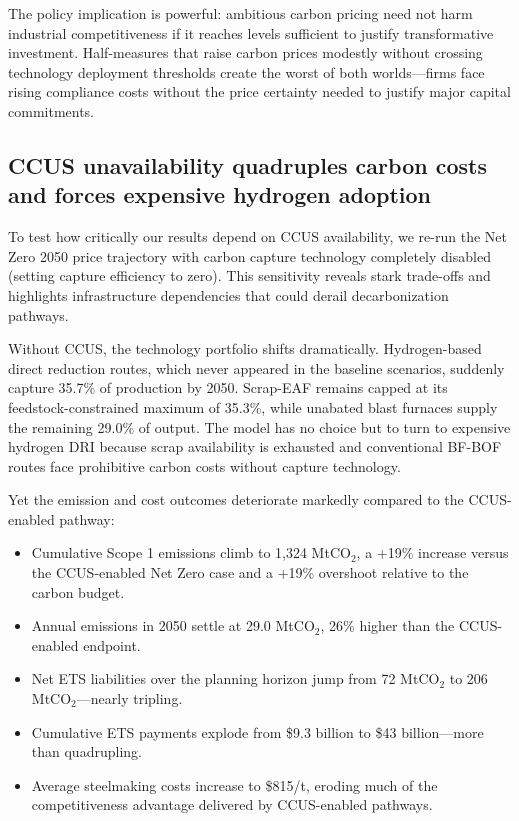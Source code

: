 \documentclass[preprint,1p,authoryear]{elsarticle}
\begin{document}
The policy implication is powerful: ambitious carbon pricing need not harm industrial competitiveness if it reaches levels sufficient to justify transformative investment. Half-measures that raise carbon prices modestly without crossing technology deployment thresholds create the worst of both worlds—firms face rising compliance costs without the price certainty needed to justify major capital commitments.

\subsection{CCUS unavailability quadruples carbon costs and forces expensive hydrogen adoption}

To test how critically our results depend on CCUS availability, we re-run the Net Zero 2050 price trajectory with carbon capture technology completely disabled (setting capture efficiency to zero). This sensitivity reveals stark trade-offs and highlights infrastructure dependencies that could derail decarbonization pathways.

Without CCUS, the technology portfolio shifts dramatically. Hydrogen-based direct reduction routes, which never appeared in the baseline scenarios, suddenly capture 35.7\% of production by 2050. Scrap-EAF remains capped at its feedstock-constrained maximum of 35.3\%, while unabated blast furnaces supply the remaining 29.0\% of output. The model has no choice but to turn to expensive hydrogen DRI because scrap availability is exhausted and conventional BF-BOF routes face prohibitive carbon costs without capture technology.

Yet the emission and cost outcomes deteriorate markedly compared to the CCUS-enabled pathway:

\begin{itemize}[leftmargin=*]
  \item Cumulative Scope 1 emissions climb to 1,324 MtCO$_2$, a +19\% increase versus the CCUS-enabled Net Zero case and a +19\% overshoot relative to the carbon budget.
  \item Annual emissions in 2050 settle at 29.0 MtCO$_2$, 26\% higher than the CCUS-enabled endpoint.
  \item Net ETS liabilities over the planning horizon jump from 72 MtCO$_2$ to 206 MtCO$_2$—nearly tripling.
  \item Cumulative ETS payments explode from \$9.3 billion to \$43 billion—more than quadrupling.
  \item Average steelmaking costs increase to \$815/t, eroding much of the competitiveness advantage delivered by CCUS-enabled pathways.
\end{itemize}
\end{document}

